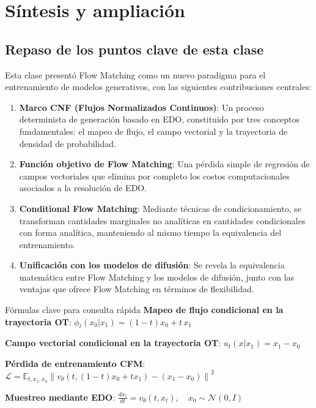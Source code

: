 \section{Síntesis y ampliación}

\subsection{Repaso de los puntos clave de esta clase}

Esta clase presentó Flow Matching como un nuevo paradigma para el entrenamiento de modelos generativos, con las siguientes contribuciones centrales:

\begin{enumerate}
    \item \textbf{Marco CNF (Flujos Normalizados Continuos)}: Un proceso determinista de generación basado en EDO, constituido por tres conceptos fundamentales: el mapeo de flujo, el campo vectorial y la trayectoria de densidad de probabilidad.
    \item \textbf{Función objetivo de Flow Matching}: Una pérdida simple de regresión de campos vectoriales que elimina por completo los costos computacionales asociados a la resolución de EDO.
    \item \textbf{Conditional Flow Matching}: Mediante técnicas de condicionamiento, se transforman cantidades marginales no analíticas en cantidades condicionales con forma analítica, manteniendo al mismo tiempo la equivalencia del entrenamiento.
    \item \textbf{Unificación con los modelos de difusión}: Se revela la equivalencia matemática entre Flow Matching y los modelos de difusión, junto con las ventajas que ofrece Flow Matching en términos de flexibilidad.
\end{enumerate}

\begin{importantbox}{Fórmulas clave para consulta rápida}
\textbf{Mapeo de flujo condicional en la trayectoria OT}: $\phi_t(x_0 | x_1) = (1 - t)x_0 + t \, x_1$

\textbf{Campo vectorial condicional en la trayectoria OT}: $u_t(x | x_1) = x_1 - x_0$

\textbf{Pérdida de entrenamiento CFM}: $\mathcal{L} = \mathbb{E}_{t, x_1, x_0} \left\| v_\theta(t, (1-t)x_0 + tx_1) - (x_1 - x_0) \right\|^2$

\textbf{Muestreo mediante EDO}: $\frac{dx_t}{dt} = v_\theta(t, x_t), \quad x_0 \sim \mathcal{N}(0, I)$
\end{importantbox}

